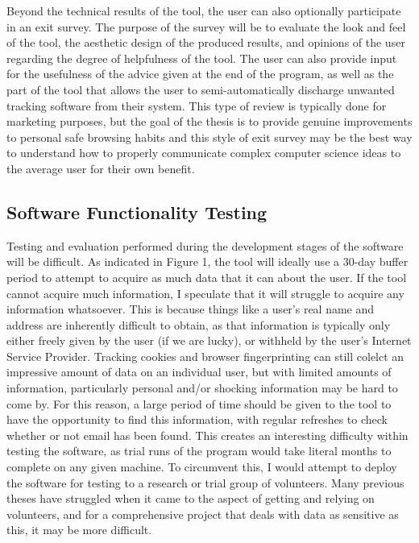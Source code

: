 \documentclass[11pt]{article}
\begin{document}
Beyond the technical results of the tool, the user can also optionally participate in an exit survey. The purpose of the survey will be to evaluate the look and feel of the tool, the aesthetic design of the produced results, and opinions of the user regarding the degree of helpfulness of the tool. The user can also provide input for the usefulness of the advice given at the end of the program, as well as the part of the tool that allows the user to semi-automatically discharge unwanted tracking software from their system. This type of review is typically done for marketing purposes, but the goal of the thesis is to provide genuine improvements to personal safe browsing habits and this style of exit survey may be the best way to understand how to properly communicate complex computer science ideas to the average user for their own benefit.

\subsection{Software Functionality Testing} \label{sec:software}

Testing and evaluation performed during the development stages of the software will be difficult. As indicated in Figure 1, the tool will ideally use a 30-day buffer period to attempt to acquire as much data that it can about the user. If the tool cannot acquire much information, I speculate that it will struggle to acquire any information whatsoever. This is because things like a user's real name and address are inherently difficult to obtain, as that information is typically only either freely given by the user (if we are lucky), or withheld by the user's Internet Service Provider. Tracking cookies and browser fingerprinting can still colelct an impressive amount of data on an individual user, but with limited amounts of information, particularly personal and/or shocking information may be hard to come by. For this reason, a large period of time should be given to the tool to have the opportunity to find this information, with regular refreshes to check whether or not email has been found. This creates an interesting difficulty within testing the software, as trial runs of the program would take literal months to complete on any given machine. To circumvent this, I would attempt to deploy the software for testing to a research or trial group of volunteers. Many previous theses have struggled when it came to the aspect of getting and relying on volunteers, and for a comprehensive project that deals with data as sensitive as this, it may be more difficult. 
\end{document}
